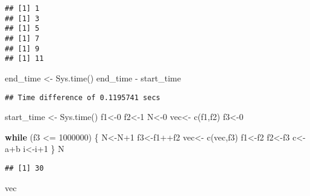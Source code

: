 \documentclass[]{elsarticle} %
\newenvironment{Shaded}{\begin{snugshade}}{\end{snugshade}}
\newcommand{\ControlFlowTok}[1]{\textcolor[rgb]{0.13,0.29,0.53}{\textbf{#1}}}
\newcommand{\DecValTok}[1]{\textcolor[rgb]{0.00,0.00,0.81}{#1}}
\newcommand{\FunctionTok}[1]{\textcolor[rgb]{0.00,0.00,0.00}{#1}}
\newcommand{\NormalTok}[1]{#1}
\newcommand{\OtherTok}[1]{\textcolor[rgb]{0.56,0.35,0.01}{#1}}
\newcommand{\SpecialCharTok}[1]{\textcolor[rgb]{0.00,0.00,0.00}{#1}}
\begin{document}
\begin{verbatim}
## [1] 1
## [1] 3
## [1] 5
## [1] 7
## [1] 9
## [1] 11
\end{verbatim}

\begin{Shaded}
\begin{Highlighting}[]
\NormalTok{end\_time }\OtherTok{\textless{}{-}} \FunctionTok{Sys.time}\NormalTok{()}
\NormalTok{end\_time }\SpecialCharTok{{-}}\NormalTok{ start\_time}
\end{Highlighting}
\end{Shaded}

\begin{verbatim}
## Time difference of 0.1195741 secs
\end{verbatim}

\begin{Shaded}
\begin{Highlighting}[]
\NormalTok{start\_time }\OtherTok{\textless{}{-}} \FunctionTok{Sys.time}\NormalTok{()}
\NormalTok{f1}\OtherTok{\textless{}{-}}\DecValTok{0}
\NormalTok{f2}\OtherTok{\textless{}{-}}\DecValTok{1}
\NormalTok{N}\OtherTok{\textless{}{-}}\DecValTok{0}
\NormalTok{vec}\OtherTok{\textless{}{-}} \FunctionTok{c}\NormalTok{(f1,f2)}
\NormalTok{f3}\OtherTok{\textless{}{-}}\DecValTok{0}

\ControlFlowTok{while}\NormalTok{ (f3 }\SpecialCharTok{\textless{}=} \DecValTok{1000000}\NormalTok{) \{}
\NormalTok{  N}\OtherTok{\textless{}{-}}\NormalTok{N}\SpecialCharTok{+}\DecValTok{1}
\NormalTok{  f3}\OtherTok{\textless{}{-}}\NormalTok{f1}\SpecialCharTok{++}\NormalTok{f2}
\NormalTok{  vec}\OtherTok{\textless{}{-}} \FunctionTok{c}\NormalTok{(vec,f3)}
\NormalTok{  f1}\OtherTok{\textless{}{-}}\NormalTok{f2}
\NormalTok{  f2}\OtherTok{\textless{}{-}}\NormalTok{f3}
\NormalTok{  c}\OtherTok{\textless{}{-}}\NormalTok{a}\SpecialCharTok{+}\NormalTok{b}
\NormalTok{  i}\OtherTok{\textless{}{-}}\NormalTok{i}\SpecialCharTok{+}\DecValTok{1}
\NormalTok{\}}
\NormalTok{N}
\end{Highlighting}
\end{Shaded}

\begin{verbatim}
## [1] 30
\end{verbatim}

\begin{Shaded}
\begin{Highlighting}[]
\NormalTok{vec}
\end{Highlighting}
\end{Shaded}
\end{document}
